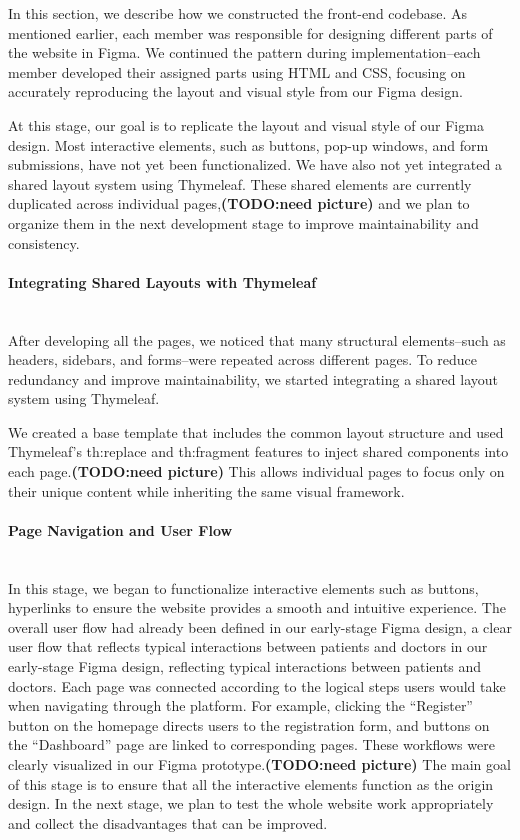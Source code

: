 In this section, we describe how we constructed the front-end codebase. As mentioned earlier, each member was responsible for designing different parts of the website in Figma. We continued the pattern during implementation–each member developed their assigned parts using HTML and CSS, focusing on accurately reproducing the layout and visual style from our Figma design.

At this stage, our goal is to replicate the layout and visual style of our Figma design. Most interactive elements, such as buttons, pop-up windows, and form submissions, have not yet been functionalized. We have also not yet integrated a shared layout system using Thymeleaf. These shared elements are currently duplicated across individual pages,\textbf{(TODO:need picture)} and we plan to organize them in the next development stage to improve maintainability and consistency.

\paragraph{Integrating Shared Layouts with Thymeleaf}\mbox{}\\

After developing all the pages, we noticed that many structural elements–such as headers, sidebars, and forms–were repeated across different pages. To reduce redundancy and improve maintainability, we started integrating a shared layout system using Thymeleaf.

We created a base template that includes the common layout structure and used Thymeleaf’s th:replace and th:fragment features to inject shared components into each page.\textbf{(TODO:need picture)} This allows individual pages to focus only on their unique content while inheriting the same visual framework.
\paragraph{Page Navigation and User Flow}\mbox{}\\

In this stage, we began to functionalize interactive elements such as buttons, hyperlinks to ensure the website provides a smooth and intuitive experience. The overall user flow had already been defined in our early-stage Figma design, a clear user flow that reflects typical interactions between patients and doctors in our early-stage Figma design, reflecting typical interactions between patients and doctors. Each page was connected according to the logical steps users would take when navigating through the platform. For example, clicking the “Register” button on the homepage directs users to the registration form, and buttons on the “Dashboard” page are linked to corresponding pages. These workflows were clearly visualized in our Figma prototype.\textbf{(TODO:need picture)} The main goal of this stage is to ensure that all the interactive elements function as the origin design. In the next stage, we plan to test the whole website work appropriately and collect the disadvantages that can be improved.
